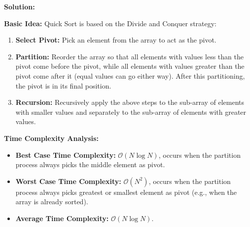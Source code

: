 \documentclass[12pt,a4paper]{article}
\newenvironment{solution}{\begin{mdframed}[linewidth=1pt,linecolor=black]\noindent\textbf{Solution:}\par\vspace{0.2cm}}{\end{mdframed}\vspace{0.5cm}}
\begin{document}
\begin{solution}
\textbf{Basic Idea:}
Quick Sort is based on the Divide and Conquer strategy:
\begin{enumerate}
    \item \textbf{Select Pivot:} Pick an element from the array to act as the pivot.
    \item \textbf{Partition:} Reorder the array so that all elements with values less than the pivot come before the pivot, while all elements with values greater than the pivot come after it (equal values can go either way). After this partitioning, the pivot is in its final position.
    \item \textbf{Recursion:} Recursively apply the above steps to the sub-array of elements with smaller values and separately to the sub-array of elements with greater values.
\end{enumerate}

\textbf{Time Complexity Analysis:}
\begin{itemize}
    \item \textbf{Best Case Time Complexity:} $\mathcal{O}(N \log N)$, occurs when the partition process always picks the middle element as pivot.
    \item \textbf{Worst Case Time Complexity:} $\mathcal{O}(N^2)$, occurs when the partition process always picks greatest or smallest element as pivot (e.g., when the array is already sorted).
    \item \textbf{Average Time Complexity:} $\mathcal{O}(N \log N)$.
\end{itemize}
\end{solution}
\end{document}
